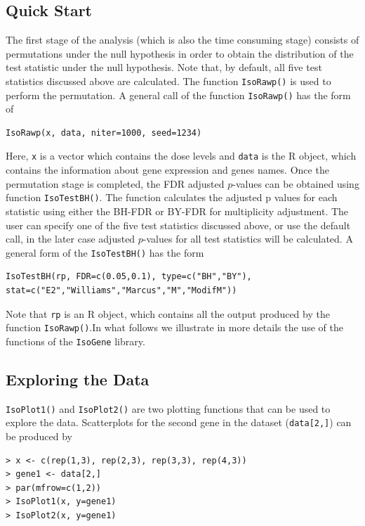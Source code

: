 \subsection{Quick Start}
The first stage of the analysis (which is also the time consuming stage) consists of permutations under the null hypothesis in order to obtain the distribution of the test statistic under the null hypothesis. Note that, by default, all five test statistics discussed above are calculated. The function \texttt{IsoRawp()} is used to perform the permutation. A general call of the function \texttt{IsoRawp()} has the form of
\begin{center}
\begin{boxit}
\begin{verbatim}
IsoRawp(x, data, niter=1000, seed=1234)
\end{verbatim}
\end{boxit}
\end{center}
Here, \texttt{x} is a vector which contains the dose levels and \texttt{data} is the R object, which contains the information about gene expression and genes names. Once the permutation stage is completed, the FDR adjusted $p$-values can be obtained using function \texttt{IsoTestBH()}. The function calculates the adjusted p values for each statistic using either the BH-FDR or BY-FDR for multiplicity adjustment. The user can specify one of the five test statistics discussed above, or use the default call, in the later case adjusted $p$-values for all test statistics will be calculated. A general form of the \texttt{IsoTestBH()} has the form
\begin{center}
\begin{boxit}
\begin{verbatim}
IsoTestBH(rp, FDR=c(0.05,0.1), type=c("BH","BY"),
stat=c("E2","Williams","Marcus","M","ModifM"))
\end{verbatim}
\end{boxit}
\end{center}
Note that \texttt{rp} is an R object, which contains all the output produced by the function \texttt{IsoRawp()}.\newline In what follows we illustrate in more details the use of the functions of the \texttt{IsoGene} library.
\subsection{Exploring the Data}
\texttt{IsoPlot1()} and \texttt{IsoPlot2()} are two plotting
functions that can be used to explore the data. Scatterplots for the
second gene in the dataset (\texttt{data[2,]}) can be produced by
\begin{center}
\begin{boxit}
\begin{verbatim}
> x <- c(rep(1,3), rep(2,3), rep(3,3), rep(4,3))
> gene1 <- data[2,]
> par(mfrow=c(1,2))
> IsoPlot1(x, y=gene1)
> IsoPlot2(x, y=gene1)
\end{verbatim}
\end{boxit}
\end{center}

